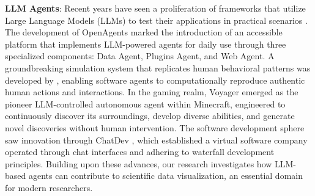 \noindent\textbf{LLM Agents}: Recent years have seen a proliferation of frameworks that utilize Large Language Models (LLMs) to test their applications in practical scenarios \cite{Nakano2021WebGPTBQ, yao2022webshop, qin2023webcpm, zhou2023webarena}. The development of OpenAgents \cite{xie2023openagents} marked the introduction of an accessible platform that implements LLM-powered agents for daily use through three specialized components: Data Agent, Plugins Agent, and Web Agent. A groundbreaking simulation system that replicates human behavioral patterns was developed by \cite{park2023generative}, enabling software agents to computationally reproduce authentic human actions and interactions. In the gaming realm, Voyager \cite{Wang2023VoyagerAO} emerged as the pioneer LLM-controlled autonomous agent within Minecraft, engineered to continuously discover its surroundings, develop diverse abilities, and generate novel discoveries without human intervention. The software development sphere saw innovation through ChatDev \cite{Qian2023ChatDevCA}, which established a virtual software company operated through chat interfaces and adhering to waterfall development principles. Building upon these advances, our research investigates how LLM-based agents can contribute to scientific data visualization, an essential domain for modern researchers.